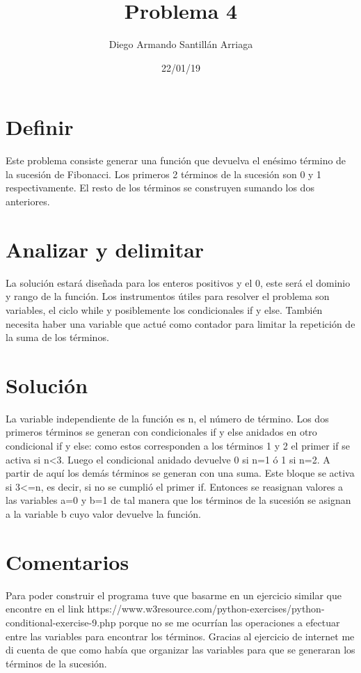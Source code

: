 \documentclass[letterpaper, 12pt, oneside]{article}%
\title{\Huge Problema 4}
\author{Diego Armando Santillán Arriaga}
\date{22/01/19}
\begin{document}
\maketitle
\newpage
\section*{Definir}
Este problema consiste generar una función que devuelva el enésimo término de la sucesión de Fibonacci. Los primeros 2 términos de la sucesión son 0 y 1 respectivamente. El resto de los términos se construyen sumando los dos anteriores. 
\section*{Analizar y delimitar}
La solución estará diseñada para los enteros positivos y el 0, este será el dominio y rango de la función. Los instrumentos útiles para resolver el problema son variables, el ciclo while y posiblemente los condicionales if y else. También necesita haber una variable que actué como contador para limitar la repetición de la suma de los términos.  
\section*{Solución}
La variable independiente de la función es n, el número de término. Los dos primeros términos se generan con condicionales if y else anidados en otro condicional if y else: como estos corresponden a los términos 1 y 2 el primer if se activa si n<3. Luego el condicional anidado devuelve 0 si n=1 ó 1 si n=2. A partir de aquí los demás términos se generan con una suma.   Este bloque se activa si 3<=n, es decir, si no se cumplió el primer if. Entonces se reasignan valores a las variables a=0 y b=1 de tal manera que los términos de la sucesión se asignan a la variable b cuyo valor devuelve la función. 

\section*{Comentarios}
Para poder construir el programa tuve que basarme en un ejercicio similar que encontre en el link https://www.w3resource.com/python-exercises/python-conditional-exercise-9.php porque no se me ocurrían las operaciones a efectuar entre las variables para encontrar los términos. Gracias al ejercicio de internet me di cuenta de que como había que organizar las variables para que se generaran los términos
de la sucesión.
	
\end{document}
